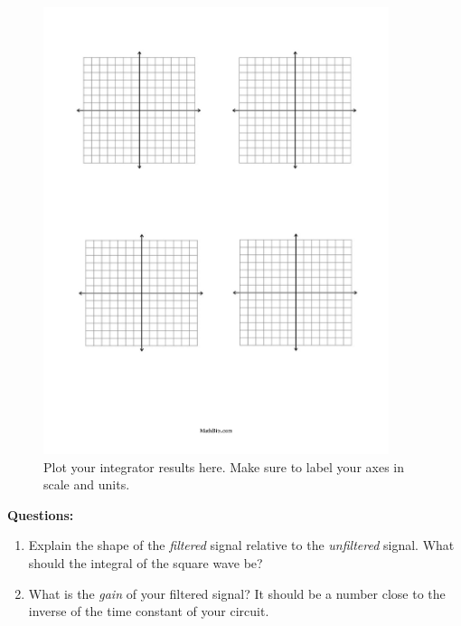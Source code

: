 \documentclass[12pt]{article}
\begin{document}
\begin{figure}[ht]
\centering
\includegraphics[width=0.9\textwidth,trim=0cm 18cm 0cm 2cm,clip=true]{axes.pdf}
\caption{\label{fig:axes} Plot your integrator results here. Make sure to label your axes in scale and units.}
\end{figure}

\vspace{5cm}

\textbf{Questions:}
\begin{enumerate}
\item Explain the shape of the \textit{filtered} signal relative to the \textit{unfiltered} signal. What should the integral of the square wave be? \\ \vspace{1.5cm}
\item What is the \textit{gain} of your filtered signal?  It should be a number close to the inverse of the time constant of your circuit. \\ \vspace{1.5cm}
\end{enumerate}
\end{document}
